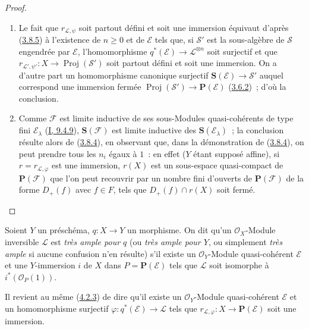 \begin{proof}
\begin{enumerate}
  \item[\rm{(i)}] Le fait que $r_{\mathcal{L},\psi}$ soit partout défini et
  soit une immersion équivaut d'après
  (\hyperref[II.3.8.5-fr]{3.8.5}) à l'existence de $n\geq0$ et de
  $\mathcal{E}$ tels que, si $\mathcal{S}'$ est la sous-algèbre de
  $\mathcal{S}$ engendrée par $\mathcal{E}$, l'homomorphisme
  $q^*(\mathcal{E})\to\mathcal{L}^{\otimes n}$ soit surjectif et que
  $r_{\mathcal{L}',\psi'}:X\to\operatorname{Proj}(\mathcal{S}')$ soit partout
  défini et soit une immersion. On a d'autre part un homomorphisme canonique
  surjectif $\mathbf{S}(\mathcal{E})\to\mathcal{S}'$ auquel correspond une
  immersion fermée
  $\operatorname{Proj}(\mathcal{S}')\to\mathbf{P}(\mathcal{E})$
  (\hyperref[II.3.6.2-fr]{3.6.2})~; d'où la conclusion.
  \item[\rm{(ii)}] Comme $\mathcal{F}$ est limite inductive de ses
  sous-Modules quasi-cohérents de type fini $\mathcal{E}_\lambda$
  (\hyperref[I.9.4.9-fr]{I, 9.4.9}), $\mathbf{S}(\mathcal{F})$ est limite
  inductive des $\mathbf{S}(\mathcal{E}_\lambda)$~; la conclusion résulte
  alors de (\hyperref[II.3.8.4-fr]{3.8.4}), en observant que, dans la
  démonstration de (\hyperref[II.3.8.4-fr]{3.8.4}), on peut prendre tous les
  $n_i$ égaux à $1$~: en effet ($Y$ étant supposé affine), si
  $r=r_{\mathcal{L},\varphi}$ est une immersion, $r(X)$ est un sous-espace
  quasi-compact de $\mathbf{P}(\mathcal{F})$ que l'on peut recouvrir par un
  nombre fini d'ouverts de $\mathbf{P}(\mathcal{F})$ de la forme $D_+(f)$ avec
  $f\in F$, tels que $D_+(f)\cap r(X)$ soit fermé.
\end{enumerate}
\end{proof}

\begin{definition}[4.4.2]
\label{II.4.4.2-fr}
Soient $Y$ un préschéma, $q:X\to Y$ un morphisme. On dit qu'un
$\mathcal{O}_X$-Module inversible $\mathcal{L}$ est \emph{très ample pour
$q$} (ou \emph{très ample pour $Y$}, ou simplement \emph{très ample} si
aucune confusion n'en résulte) s'il existe un $\mathcal{O}_Y$-Module
quasi-cohérent $\mathcal{E}$ et une $Y$-immersion $i$ de $X$ dans
$P=\mathbf{P}(\mathcal{E})$ tels que $\mathcal{L}$ soit isomorphe à
$i^*(\mathcal{O}_P(1))$.
\end{definition}

Il revient au même (\hyperref[II.4.2.3-fr]{4.2.3}) de dire qu'il existe un
$\mathcal{O}_Y$-Module quasi-cohérent $\mathcal{E}$ et un homomorphisme
surjectif $\varphi:q^*(\mathcal{E})\to\mathcal{L}$ tels que
$r_{\mathcal{L},\varphi}:X\to\mathbf{P}(\mathcal{E})$ soit une immersion.

